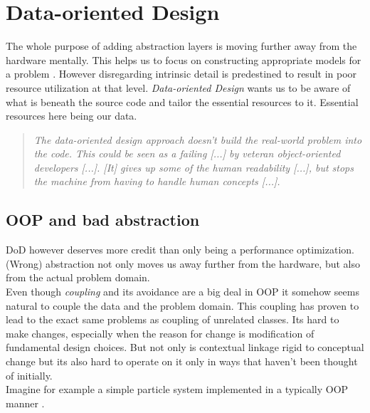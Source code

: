 \section{Data-oriented Design}\label{dod}
The whole purpose of adding abstraction layers is moving further away from the hardware mentally. This helps us to focus on constructing appropriate models for a problem . However disregarding intrinsic detail is predestined to result in poor resource utilization at that level. \textit{Data-oriented Design} wants us to be aware of what is beneath the source code and tailor the essential resources to it. Essential resources here being our data. 
\begin{quote}
	\textit{The data-oriented design approach doesn't build the real-world problem into the code. This could be seen as a failing [...] by veteran object-oriented developers [...]. [It] gives up some of the human readability [...], but stops the machine from having to handle human concepts [...].} 
\end{quote}
\subsection{OOP and bad abstraction}\label{oop_bad_abstraction}
DoD however deserves more credit than only being a performance optimization. (Wrong) abstraction not only moves us away further from the hardware, but also from the actual problem domain.\\
Even though \textit{coupling} and its avoidance are a big deal in OOP it somehow seems natural to couple the data and the problem domain. This coupling has proven to lead to the exact same problems as coupling of unrelated classes. Its hard to make changes, especially when the reason for change is modification of fundamental design choices. But not only is contextual linkage rigid to conceptual change but its also hard to operate on it only in ways that haven't been thought of initially.\\
Imagine for example a simple particle system implemented in a typically OOP manner .

